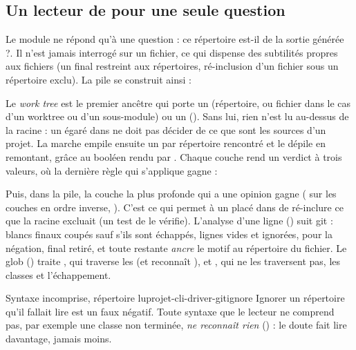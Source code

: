 \subsection{Un lecteur de  pour une seule question}

Le module  ne répond qu'à une question : \og ce répertoire est-il de la sortie générée ?\fg{}. Il n'est jamais interrogé sur un fichier, ce qui dispense des subtilités propres aux fichiers (un \code{/} final restreint aux répertoires, ré-inclusion d'un fichier sous un répertoire exclu). La pile se construit ainsi :


Le \emph{work tree} est le premier ancêtre qui porte un  (répertoire, ou fichier dans le cas d'un worktree ou d'un sous-module) ou un  (). Sans lui, rien n'est lu au-dessus de la racine : un  égaré dans  ne doit pas décider de ce que sont les sources d'un projet. La marche empile ensuite un  par répertoire rencontré et le dépile en remontant, grâce au booléen rendu par . Chaque couche rend un verdict à trois valeurs, où la dernière règle qui s'applique gagne :


Puis, dans la pile, la couche la plus profonde qui a une opinion gagne ( sur les couches en ordre inverse, ). C'est ce qui permet à un  placé dans  de ré-inclure ce que la racine excluait (un test de  le vérifie). L'analyse d'une ligne () suit git : blancs finaux coupés sauf s'ils sont échappés, lignes vides et  ignorées, \code{!} pour la négation, \code{/} final retiré, et toute \code{/} restante \emph{ancre} le motif au répertoire du fichier. Le glob () traite \code{**}, qui traverse les \code{/} (et  reconnaît ), \code{*} et , qui ne les traversent pas, les classes \code{[…]} et l'échappement.

\begin{invariant}{Syntaxe incomprise, répertoire lu}{projet-cli-driver-gitignore}
Ignorer un répertoire qu'il fallait lire est un faux négatif. Toute syntaxe que le lecteur ne comprend pas, par exemple une classe \code{[} non terminée, \emph{ne reconnaît rien} () : le doute fait lire davantage, jamais moins.
\end{invariant}

